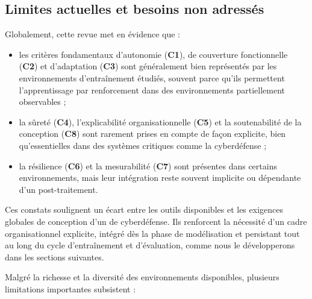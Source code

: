 \subsection{Limites actuelles et besoins non adressés}

Globalement, cette revue met en évidence que :
\begin{itemize}
    \item les critères fondamentaux d’autonomie (\textbf{C1}), de couverture fonctionnelle (\textbf{C2}) et d’adaptation (\textbf{C3}) sont généralement bien représentés par les environnements d'entraînement étudiés, souvent parce qu’ils permettent l’apprentissage par renforcement dans des environnements partiellement observables ;
    \item la sûreté (\textbf{C4}), l’explicabilité organisationnelle (\textbf{C5}) et la soutenabilité de la conception (\textbf{C8}) sont rarement prises en compte de façon explicite, bien qu’essentielles dans des systèmes critiques comme la cyberdéfense ;
    \item la résilience (\textbf{C6}) et la mesurabilité (\textbf{C7}) sont présentes dans certains environnements, mais leur intégration reste souvent implicite ou dépendante d’un post-traitement.
\end{itemize}

Ces constats soulignent un écart entre les outils disponibles et les exigences globales de conception d’un  de cyberdéfense. Ils renforcent la nécessité d’un cadre organisationnel explicite, intégré dès la phase de modélisation et persistant tout au long du cycle d’entraînement et d’évaluation, comme nous le développerons dans les sections suivantes.

\medskip

Malgré la richesse et la diversité des environnements disponibles, plusieurs limitations importantes subsistent :

